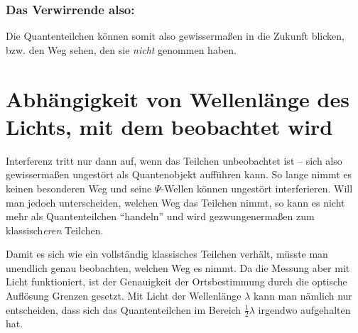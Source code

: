\subsubsection{Das Verwirrende also:} Die Quantenteilchen können somit also gewissermaßen in die Zukunft blicken, bzw. den Weg sehen, den sie \emph{nicht} genommen haben.










\section{Abhängigkeit von Wellenlänge des Lichts, mit dem beobachtet wird}

Interferenz tritt nur dann auf, wenn das Teilchen unbeobachtet ist -- sich also gewissermaßen ungestört als Quantenobjekt aufführen kann. So lange nimmt es keinen besonderen Weg und seine $\Psi$-Wellen können ungestört interferieren. Will man jedoch unterscheiden, welchen Weg das Teilchen nimmt, so kann es nicht mehr als Quantenteilchen "`handeln"' und wird gezwungenermaßen zum klassisch\emph{eren} Teilchen.

Damit es sich wie ein vollständig klassisches Teilchen verhält, müsste man unendlich genau beobachten, welchen Weg es nimmt. Da die Messung aber mit Licht funktioniert, ist der Genauigkeit der Ortsbestimmung durch die optische Auflösung Grenzen gesetzt. Mit Licht der Wellenlänge $\lambda$ kann man nämlich nur entscheiden, dass sich das Quantenteilchen im Bereich $\frac{1}{2} \lambda$ irgendwo aufgehalten hat.

% 

